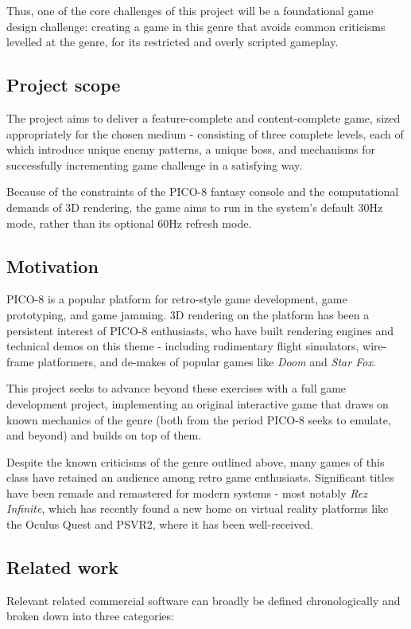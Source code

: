 \documentclass{article}
\begin{document}
Thus, one of the core challenges of this project will be a foundational game design challenge:
creating a game in this genre that avoids common criticisms levelled at the genre, for its
restricted and overly scripted gameplay.

\subsection*{Project scope}
The project aims to deliver a feature-complete and content-complete game,
sized appropriately for the chosen medium - consisting of three complete
levels, each of which introduce unique enemy patterns, a unique boss, and
mechanisms for successfully incrementing game challenge in a satisfying way.

Because of the constraints of the PICO-8 fantasy console and the computational
demands of 3D rendering, the game aims to run in the system's default 30Hz mode,
rather than its optional 60Hz refresh mode.

\subsection*{Motivation}
PICO-8 is a popular platform for retro-style game development, game prototyping, and game jamming.
3D rendering on the platform has been a persistent interest of PICO-8 enthusiasts, who have built
rendering engines and technical demos on this theme - including rudimentary flight simulators,
wire-frame platformers, and de-makes of popular games like \textit{Doom} and \textit{Star Fox}.

This project seeks to advance beyond these exercises with a full game development project, implementing
an original interactive game that draws on known mechanics of the genre (both from the period PICO-8 seeks
to emulate, and beyond) and builds on top of them.

Despite the known criticisms of the genre outlined above, many games of this
class have retained an audience among retro game enthusiasts. Significant titles have been
remade and remastered for modern systems - most notably \textit{Rez Infinite}, which has
recently found a new home on virtual reality platforms like the Oculus Quest and PSVR2,
where it has been well-received.

\subsection*{Related work}
Relevant related commercial software can broadly be defined
chronologically and broken down into three categories:
\end{document}
